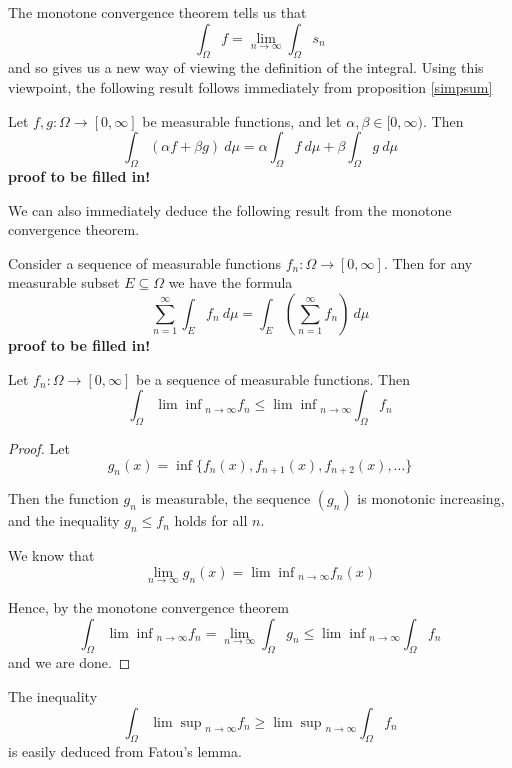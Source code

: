 The monotone convergence theorem tells us that
$$\int_\Omega f = \lim_{n\rightarrow \infty} \int_\Omega s_n$$
and so gives us a new way of viewing the definition of the integral.  Using this viewpoint, the following result follows immediately from proposition \ref{simpsum}

\begin{corollary}
Let $f,g\colon \Omega \rightarrow [0,\infty ]$ be measurable functions, and let $\alpha, \beta \in [0, \infty )$.  Then
$$\int_\Omega (\alpha f+ \beta g)\ d\mu = \alpha \int_\Omega f\ d\mu + \beta \int_\Omega g\ d\mu$$
\textbf{proof to be filled in!}
\end{corollary}

We can also immediately deduce the following result from the monotone convergence theorem.

\begin{corollary}
Consider a sequence of measurable functions $f_n \colon \Omega \rightarrow [0,\infty ]$.  Then for any measurable subset $E\subseteq \Omega$ we have the formula$$\sum_{n=1}^\infty \int_E f_n\ d\mu = \int_E \left( \sum_{n=1}^\infty f_n \right) \ d\mu$$
\textbf{proof to be filled in!}
\end{corollary}

\begin{theorem}

Let $f_n \colon \Omega \rightarrow [0,\infty ]$ be a sequence of measurable functions.  Then
$$\int_\Omega {\lim \inf}_{n\rightarrow \infty} f_n \leq {\lim \inf}_{n\rightarrow \infty} \int_\Omega f_n$$
\end{theorem}

\begin{proof}
Let
$$g_n (x) = \inf \{ f_n (x) , f_{n+1} (x) , f_{n+2} (x) , \ldots \}$$

Then the function $g_n$ is measurable, the sequence $(g_n)$ is monotonic increasing, and the inequality $g_n \leq f_n$ holds for all $n$.

We know that
$$\lim_{n\rightarrow \infty} g_n (x) = {\lim \inf}_{n\rightarrow \infty} f_n (x)$$

Hence, by the monotone convergence theorem
$$\int_\Omega {\lim \inf}_{n\rightarrow \infty} f_n  = \lim_{n\rightarrow \infty} \int_\Omega g_n \leq {\lim \inf}_{n\rightarrow \infty} \int_\Omega f_n$$
and we are done.
\end{proof}

The inequality 
$$\int_\Omega {\lim \sup}_{n\rightarrow \infty} f_n \geq {\lim \sup}_{n\rightarrow \infty} \int_\Omega f_n$$
is easily deduced from Fatou's lemma.

